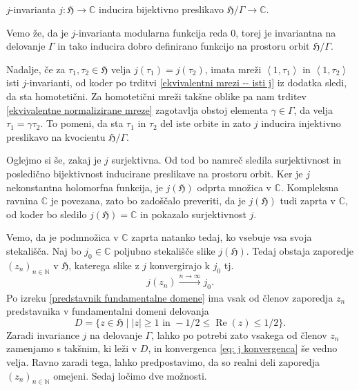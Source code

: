 \documentclass[mat1]{fmfdelo}
\numberwithin{equation}{section}
\newcommand{\N}{\mathbb N}
\newcommand{\C}{\mathbb C}
\newcommand{\HH}{\mathfrak{H}}
\newcommand{\SL}{\Gamma}
\newcommand{\abs}[1]{\left\lvert #1 \right\rvert}
\newcommand{\lattice}[2]{\left\langle #1, #2 \right\rangle}
\renewcommand\Re{\operatorname{Re}}%
\newcommand{\tj}{tj.\ }
\theoremstyle{definition}
\begin{document}


\begin{izrek}
    \label{bijektivnost j-invariante}
    $j$-invarianta $j : \HH \to \C$ inducira bijektivno preslikavo $\HH/\SL \to \C $.
\end{izrek}
    
\begin{dokaz}
    Vemo že, da je $j$-invarianta modularna funkcija reda $0$, torej je invariantna na delovanje $\SL$ in tako inducira dobro definirano funkcijo na prostoru orbit $\HH/\SL$. 
    
    Nadalje, če za $\tau_1, \tau_2 \in \HH$ velja $j(\tau_1) = j(\tau_2)$, imata mreži $\lattice{1}{\tau_1}$ in $\lattice{1}{\tau_2}$ isti $j$-invarianti, od koder po trditvi \ref{ekvivalentni mrezi -- isti j} iz dodatka sledi, da sta homotetični. Za homotetični mreži takšne oblike pa nam trditev \ref{ekvivalentne normalizirane mreze} zagotavlja obstoj elementa $\gamma \in \SL$, da velja $\tau_1 = \gamma \tau_2$. To pomeni, da sta $\tau_1$ in $\tau_2$ del iste orbite in zato $j$ inducira injektivno preslikavo na kvocientu $\HH/\SL$.

    Oglejmo si še, zakaj je $j$ surjektivna. Od tod bo namreč sledila surjektivnost in posledično bijektivnost inducirane preslikave na prostoru orbit. Ker je $j$ nekonstantna holomorfna funkcija, je $j(\HH)$ odprta množica v $\C$. Kompleksna ravnina $\C$ je povezana, zato bo zadoščalo preveriti, da je $j(\HH)$ tudi zaprta v $\C$, od koder bo sledilo $j(\HH) = \C$ in pokazalo surjektivnost $j$. 

    Vemo, da je podmnožica v $\C$ zaprta natanko tedaj, ko vsebuje vsa svoja stekališča. Naj bo $j_0 \in \C$ poljubno stekališče slike $j(\HH)$. Tedaj obstaja zaporedje $(z_n)_{n\in \N}$ v $\HH$, katerega slike z $j$ konvergirajo k $j_0$ \tj 
    \begin{equation}
        \label{eq: j konvergenca}
        j(z_n) \xrightarrow[]{n \to \infty} j_0. 
    \end{equation}
    Po izreku \ref{predstavnik fundamentalne domene} ima vsak od členov zaporedja $z_n$ predstavnika v fundamentalni domeni delovanja 
    \[
        D = \{z \in \HH \mid \abs{z} \geq 1 \text{ in } -1/2\leq \Re(z) \leq 1/2\}. 
    \]
    Zaradi invariance $j$ na delovanje $\SL$, lahko po potrebi zato vsakega od členov $z_n$ zamenjamo s takšnim, ki leži v $D$, in konvergenca \eqref{eq: j konvergenca} še vedno velja. 
    Ravno zaradi tega, lahko predpostavimo, da so realni deli zaporedja $(z_n)_{n\in \N}$ omejeni. Sedaj ločimo dve možnosti.


\end{dokaz}
\end{document}
